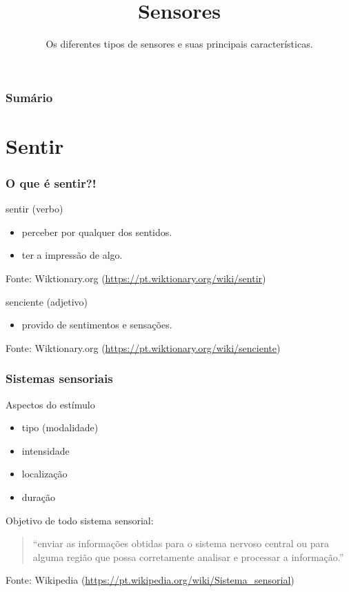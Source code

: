 \documentclass{beamer}
\title{Sensores}
\subtitle{Os diferentes tipos de sensores e suas principais características.}
\begin{document}
\frame{\titlepage}

\begin{frame}
	\frametitle{Sumário}
	\tableofcontents
\end{frame}

\section{Sentir}

\begin{frame}
	\frametitle{O que é sentir?!}
	sentir (verbo)
	\begin{itemize}
		\item perceber por qualquer dos sentidos.
		\item ter a impressão de algo.
	\end{itemize}
	{\scriptsize Fonte: Wiktionary.org (\url{https://pt.wiktionary.org/wiki/sentir})}\\
	\bigskip
	
	senciente (adjetivo)
	\begin{itemize}
		\item provido de sentimentos e sensações.
	\end{itemize}
	{\scriptsize Fonte: Wiktionary.org (\url{https://pt.wiktionary.org/wiki/senciente})}\\
\end{frame}

\begin{frame}
	\frametitle{Sistemas sensoriais}
	Aspectos do estímulo
	\begin{itemize}
		\item tipo (modalidade)
		\item intensidade
		\item localização
		\item duração
	\end{itemize}
	Objetivo de todo sistema sensorial:
	\begin{quote}
		``enviar as informações obtidas para o sistema nervoso central ou para alguma região que possa corretamente analisar e processar a informação.''
	\end{quote}
	{\scriptsize Fonte: Wikipedia (\url{https://pt.wikipedia.org/wiki/Sistema_sensorial})}
\end{frame}
\end{document}

